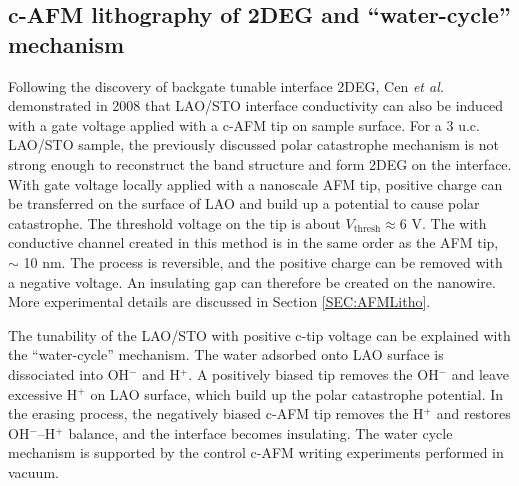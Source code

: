 \documentclass[pdflatex, sectionletters, 12pt]{pittetd}    %
\begin{document}
\subsection{c-AFM lithography of 2DEG and ``water-cycle'' mechanism}
\label{SEC:WaterCycle}

Following the discovery of backgate tunable interface 2DEG, Cen \textit{et al.}  demonstrated in 2008 that LAO/STO interface conductivity can also be induced with a gate voltage applied with a c-AFM tip on sample surface\cite{cen2008nanoscale}. For a 3 u.c. LAO/STO sample, the previously discussed polar catastrophe mechanism is not strong enough to reconstruct the band structure and form 2DEG on the interface. With gate voltage locally applied with a nanoscale AFM tip, positive charge can be transferred on the surface of LAO and build up a potential to cause polar catastrophe. The threshold voltage on the tip is about $V_\mathrm{thresh} \approx 6$ V\cite{cen2008nanoscale}. The with conductive channel created in this method is in the same order as the AFM tip, $\sim$ 10 nm. The process is reversible, and the positive charge can be removed with a negative voltage. An insulating gap can therefore be created on the nanowire. More experimental details are discussed in Section \ref{SEC:AFMLitho}.

The tunability of the LAO/STO with positive c-tip voltage can be explained with the ``water-cycle'' mechanism\cite{bi2010water}. The water adsorbed onto LAO surface is dissociated into OH$^{-}$ and H$^{+}$. A positively biased tip removes the OH$^{-}$ and leave excessive H$^{+}$ on LAO surface, which build up the polar catastrophe potential. In the erasing process, the negatively biased c-AFM tip removes the H$^{+}$ and restores OH$^{-}$--H$^{+}$ balance, and the interface becomes insulating. The water cycle mechanism is supported by the control c-AFM writing experiments performed in vacuum\cite{bi2010water}.
\end{document}
